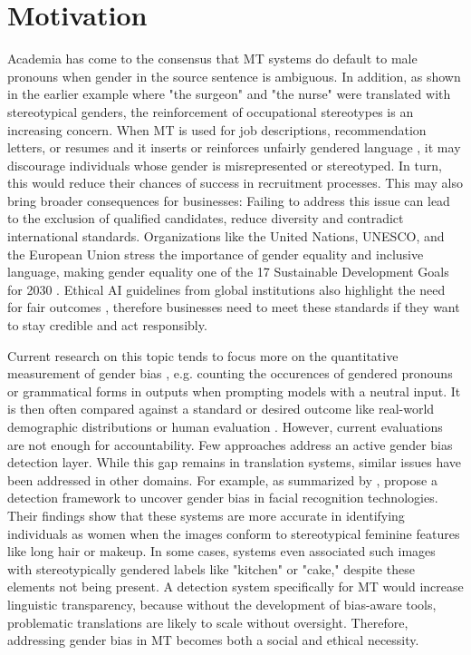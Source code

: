 \section{Motivation}

Academia has come to the consensus that MT systems do default to male pronouns when gender in the source sentence is ambiguous. In addition, as shown in the earlier example where "the surgeon" and "the nurse" were translated with stereotypical genders, the reinforcement of occupational stereotypes is an increasing concern. When MT is used for job descriptions, recommendation letters, or resumes and it inserts or reinforces unfairly gendered language \citep{bolukbasiManComputerProgrammer2016}, it may discourage individuals whose gender is misrepresented or stereotyped. In turn, this would reduce their chances of success in recruitment processes. 
This may also bring broader consequences for businesses: Failing to address this issue can lead to the exclusion of qualified candidates, reduce diversity and contradict international standards. Organizations like the United Nations, UNESCO, and the European Union stress the importance of gender equality and inclusive language, making gender equality one of the 17 Sustainable Development Goals for 2030 \citep{sczesnyCanGenderFairLanguage2016,unitednationsAchieveGenderEquality2023}.
Ethical AI guidelines from global institutions also highlight the need for fair outcomes \citep{ullmannGenderBiasMachine2022}, therefore businesses need to meet these standards if they want to stay credible and act responsibly. 

Current research on this topic tends to focus more on the quantitative measurement of gender bias \citep{rescignoGenderBiasMachine2023,barclayInvestigatingMarkersDrivers2024a,smacchiaDoesAIReflect2024}, e.g. counting the occurences of gendered pronouns or grammatical forms in outputs when prompting models with a neutral input. It is then often compared against a standard or desired outcome like real-world demographic distributions \citep{smacchiaDoesAIReflect2024,pratesAssessingGenderBias2019} or human evaluation \citep{lardelliBuildingBridgesDataset2024,savoldiWhatHarmQuantifying2024}. However, current evaluations are not enough for accountability. Few approaches address an active gender bias detection layer. While this gap remains in translation systems, similar issues have been addressed in other domains. For example, as summarized by \citet{shresthaExploringGenderBiases2022}, \citet{schwemmerDiagnosingGenderBias2020} propose a detection framework to uncover gender bias in facial recognition technologies. Their findings show that these systems are more accurate in identifying individuals as women when the images conform to stereotypical feminine features like long hair or makeup. In some cases, systems even associated such images with stereotypically gendered labels like "kitchen" or "cake," despite these elements not being present. 
A detection system specifically for MT would increase linguistic transparency, because without the development of bias-aware tools, problematic translations are likely to scale without oversight. Therefore, addressing gender bias in MT becomes both a social and ethical necessity.

